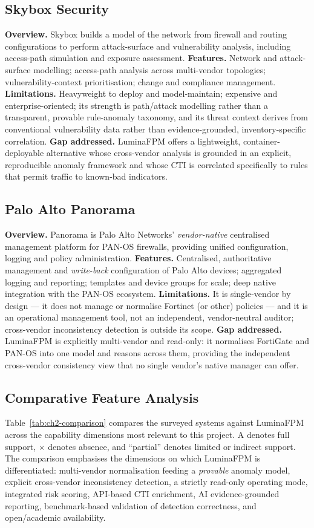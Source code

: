 \documentclass[12pt,a4paper]{report}
\renewcommand{\_}{\textunderscore\allowbreak}
\begin{document}
\subsection{Skybox Security}
\textbf{Overview.} Skybox builds a model of the network from firewall and routing configurations to perform attack-surface and vulnerability analysis, including access-path simulation and exposure assessment.
\textbf{Features.} Network and attack-surface modelling; access-path analysis across multi-vendor topologies; vulnerability-context prioritisation; change and compliance management.
\textbf{Limitations.} Heavyweight to deploy and model-maintain; expensive and enterprise-oriented; its strength is path/attack modelling rather than a transparent, provable rule-anomaly taxonomy, and its threat context derives from conventional vulnerability data rather than evidence-grounded, inventory-specific correlation.
\textbf{Gap addressed.} LuminaFPM offers a lightweight, container-deployable alternative whose cross-vendor analysis is grounded in an explicit, reproducible anomaly framework and whose CTI is correlated specifically to rules that permit traffic to known-bad indicators.

\subsection{Palo Alto Panorama}
\textbf{Overview.} Panorama is Palo Alto Networks' \emph{vendor-native} centralised management platform for PAN-OS firewalls, providing unified configuration, logging and policy administration.
\textbf{Features.} Centralised, authoritative management and \emph{write-back} configuration of Palo Alto devices; aggregated logging and reporting; templates and device groups for scale; deep native integration with the PAN-OS ecosystem.
\textbf{Limitations.} It is single-vendor by design --- it does not manage or normalise Fortinet (or other) policies --- and it is an operational management tool, not an independent, vendor-neutral auditor; cross-vendor inconsistency detection is outside its scope.
\textbf{Gap addressed.} LuminaFPM is explicitly multi-vendor and read-only: it normalises FortiGate and PAN-OS into one model and reasons across them, providing the independent cross-vendor consistency view that no single vendor's native manager can offer.

\subsection{Comparative Feature Analysis}
\label{sec:ch2-comparison}
Table~\ref{tab:ch2-comparison} compares the surveyed systems against LuminaFPM across the capability dimensions most relevant to this project. A \checkmark{} denotes full support, $\times$ denotes absence, and ``partial'' denotes limited or indirect support. The comparison emphasises the dimensions on which LuminaFPM is differentiated: multi-vendor normalisation feeding a \emph{provable} anomaly model, explicit cross-vendor inconsistency detection, a strictly read-only operating mode, integrated risk scoring, API-based CTI enrichment, AI evidence-grounded reporting, benchmark-based validation of detection correctness, and open/academic availability.
\end{document}
